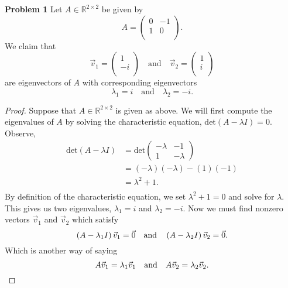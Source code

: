 \documentclass{article}
\begin{document}
\textbf{Problem 1}
Let $A \in \mathbb{R}^{2 \times 2}$ be given by $$A = \begin{pmatrix} 
0 & -1\\
1 & 0\\
\end{pmatrix}.$$ We claim that 
$$\vec{v}_1 = \begin{pmatrix} 
1\\
-i\\
\end{pmatrix} \quad \text{and} \quad \vec{v}_2 = \begin{pmatrix} 
1\\
i\\
\end{pmatrix}$$ are eigenvectors of $A$ with corresponding eigenvectors $$\lambda_1 = i \quad \text{and} \quad \lambda_2 = -i.$$
\begin{proof}
Suppose that $A \in \mathbb{R}^{2\times2}$ is given as above. We will first compute the eigenvalues of $A$ by solving the characteristic equation, det$\left( A - \lambda I \right) = 0.$ Observe,
\begin{align*}
\text{det}\left( A - \lambda I \right) &= \text{det}\begin{pmatrix}-\lambda&-1\\1&-\lambda\end{pmatrix}\\
&= \left(-\lambda\right)\left(-\lambda\right) - \left(1\right)\left(-1\right)\\
&= \lambda^2 +1.\\
\end{align*}
By definition of the characteristic equation, we set $\lambda^2 + 1 = 0$ and solve for $\lambda$. This gives us two eigenvalues, $\lambda_1 = i$ and $\lambda_2 = -i$. Now we must find nonzero vectors $\vec{v}_1$ and $\vec{v}_2$ which satisfy
\begin{equation*}
\left( A - \lambda_1 I \right)\vec{v}_1 = \vec{0} \quad \text{and} \quad \left( A - \lambda_2 I \right)\vec{v}_2 = \vec{0}.\\
\end{equation*}
Which is another way of saying
\begin{equation*}
A\vec{v}_1 = \lambda_1 \vec{v}_1 \quad \text{and} \quad A\vec{v}_2 = \lambda_2 \vec{v}_2.\\
\end{equation*}


\end{proof}
\end{document}
